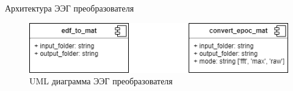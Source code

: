 \begin{frame}{Архитектура ЭЭГ преобразователя}
	\begin{figure}
        \includegraphics[width=\textwidth]{img/converter_uml.png}
        \caption{UML диаграмма ЭЭГ преобразователя}
    \end{figure}
\end{frame}
